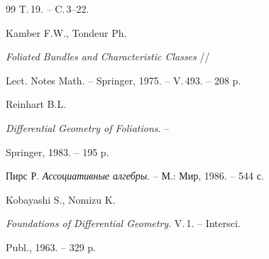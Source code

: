 \begin{thebibliography}{99}
T.\,19. -- C.\,3--22.







Kamber F.W., Tondeur Ph.


{\it Foliated Bundles and Characteristic Classes} //


Lect. Notes Math. -- Springer, 1975. -- V.\,493. -- 208 p.







Reinhart B.L.


{\it Differential Geometry of Foliations}. --


Springer, 1983. -- 195 p.







Пирс Р. {\it Ассоциативные алгебры}. -- М.: Мир, 1986. -- 544 с.







Kobayashi S., Nomizu K.


{\it Foundations of Differential Geometry}. V.\,1. -- Intersci.


Publ., 1963. -- 329 p.








\end{thebibliography}





\vskip 0.5cm












\label{end}






